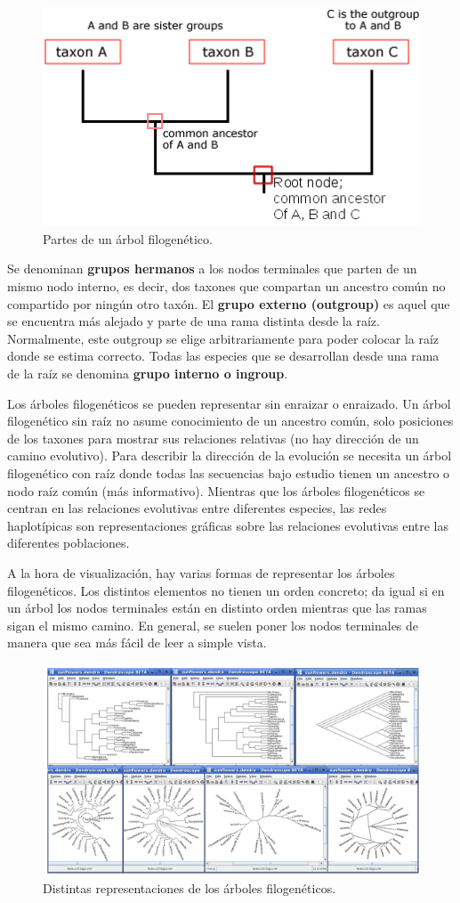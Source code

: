 \begin{figure}[htbp]
\centering
\includegraphics[width=0.5\linewidth]{figs/taxon-tree.png}
\caption{Partes de un árbol filogenético.}
\end{figure}

Se denominan \textbf{grupos hermanos} a los nodos terminales que parten de un mismo nodo interno, es decir, dos taxones que compartan un ancestro común no compartido por ningún otro taxón. El \textbf{grupo externo (outgroup)} es aquel que se encuentra más alejado y parte de una rama distinta desde la raíz. Normalmente, este outgroup se elige arbitrariamente para poder colocar la raíz donde se estima correcto. Todas las especies que se desarrollan desde una rama de la raíz se denomina \textbf{grupo interno o ingroup}. 

Los árboles filogenéticos se pueden representar sin enraizar o enraizado. Un árbol filogenético sin raíz no asume conocimiento de un ancestro común, solo posiciones de los taxones para mostrar sus relaciones relativas (no hay dirección de un camino evolutivo). Para describir la dirección de la evolución se necesita un árbol filogenético con raíz donde todas las secuencias bajo estudio tienen un ancestro o nodo raíz común (más informativo). Mientras que los árboles filogenéticos se centran en las relaciones evolutivas entre diferentes especies, las redes haplotípicas son representaciones gráficas sobre las relaciones evolutivas entre las diferentes poblaciones.

A la hora de visualización, hay varias formas de representar los árboles filogenéticos. Los distintos elementos no tienen un orden concreto; da igual si en un árbol los nodos terminales están en distinto orden mientras que las ramas sigan el mismo camino. En general, se suelen poner los nodos terminales de manera que sea más fácil de leer a simple vista.

\begin{figure}[htbp]
\centering
\includegraphics[width=0.5\linewidth]{figs/representaciones-arboles.png}
\caption{Distintas representaciones de los árboles filogenéticos.}
\end{figure}

